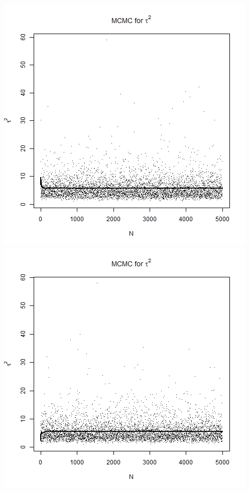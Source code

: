 \documentclass{article}
\begin{document}
\begin{enumerate}[8.1]
\begin{enumerate}[(a)]
\includegraphics[scale = 0.3]{tau.png}
\includegraphics[scale = 0.3]{tau-a.png}

\end{enumerate}
\end{enumerate}
\end{document}
